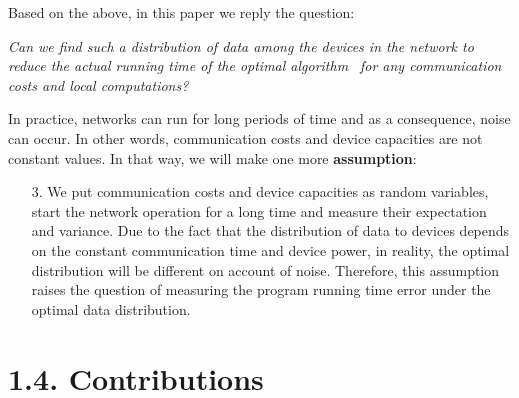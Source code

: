 \documentclass{article}
\theoremstyle{definition}
\theoremstyle{plain}
\begin{document}
Based on the above, in this paper we reply the question: 
\begin{center}
    \textit{ Can we find such a distribution of data among the devices in the network to reduce the actual running time of the optimal algorithm} \cite{kovalev2022optimal}\textit{~for any communication costs and local computations?}
\end{center}

In practice, networks can run for long periods of time and as a consequence, noise can occur. In other words, communication costs and device capacities are not constant values. In that way, we will make one more \textbf{assumption}:
\begin{itemize}
    \item [3.] We put communication costs and device capacities as random variables, start the network operation for a long time and measure their expectation and variance. Due to the fact that the distribution of data to devices depends on the constant communication time and device power, in reality, the optimal distribution will be different on account of noise. Therefore, this assumption raises the question of measuring the program running time error under the optimal data distribution.
\end{itemize}

\section*{1.4. Contributions}
\end{document}
